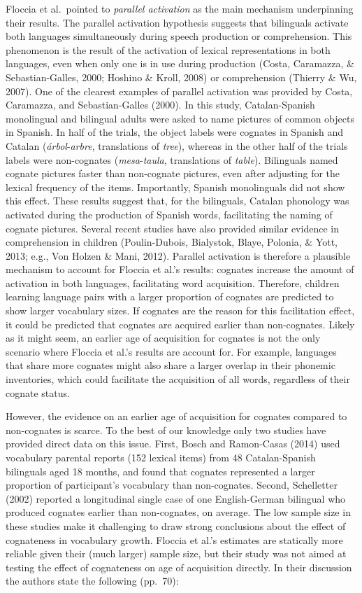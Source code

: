 \documentclass[
  english,
  man,man,floatsintext]{apa6}
\begin{document}
Floccia et al.~pointed to \emph{parallel activation} as the main mechanism underpinning their results. The parallel activation hypothesis suggests that bilinguals activate both languages simultaneously during speech production or comprehension. This phenomenon is the result of the activation of lexical representations in both languages, even when only one is in use during production (Costa, Caramazza, \& Sebastian-Galles, 2000; Hoshino \& Kroll, 2008) or comprehension (Thierry \& Wu, 2007). One of the clearest examples of parallel activation was provided by Costa, Caramazza, and Sebastian-Galles (2000). In this study, Catalan-Spanish monolingual and bilingual adults were asked to name pictures of common objects in Spanish. In half of the trials, the object labels were cognates in Spanish and Catalan (\emph{árbol}-\emph{arbre}, translations of \emph{tree}), whereas in the other half of the trials labels were non-cognates (\emph{mesa}-\emph{taula}, translations of \emph{table}). Bilinguals named cognate pictures faster than non-cognate pictures, even after adjusting for the lexical frequency of the items. Importantly, Spanish monolinguals did not show this effect. These results suggest that, for the bilinguals, Catalan phonology was activated during the production of Spanish words, facilitating the naming of cognate pictures. Several recent studies have also provided similar evidence in comprehension in children (Poulin-Dubois, Bialystok, Blaye, Polonia, \& Yott, 2013; e.g., Von Holzen \& Mani, 2012). Parallel activation is therefore a plausible mechanism to account for Floccia et al.'s results: cognates increase the amount of activation in both languages, facilitating word acquisition. Therefore, children learning language pairs with a larger proportion of cognates are predicted to show larger vocabulary sizes. If cognates are the reason for this facilitation effect, it could be predicted that cognates are acquired earlier than non-cognates. Likely as it might seem, an earlier age of acquisition for cognates is not the only scenario where Floccia et al.'s results are account for.
For example, languages that share more cognates might also share a larger overlap in their phonemic inventories, which could facilitate the acquisition of all words, regardless of their cognate status.

However, the evidence on an earlier age of acquisition for cognates compared to non-cognates is scarce. To the best of our knowledge only two studies have provided direct data on this issue. First, Bosch and Ramon-Casas (2014) used vocabulary parental reports (152 lexical items) from 48 Catalan-Spanish bilinguals aged 18 months, and found that cognates represented a larger proportion of participant's vocabulary than non-cognates. Second, Schelletter (2002) reported a longitudinal single case of one English-German bilingual who produced cognates earlier than non-cognates, on average. The low sample size in these studies make it challenging to draw strong conclusions about the effect of cognateness in vocabulary growth. Floccia et al.'s estimates are statically more reliable given their (much larger) sample size, but their study was not aimed at testing the effect of cognateness on age of acquisition directly. In their discussion the authors state the following (pp.~70):
\end{document}
